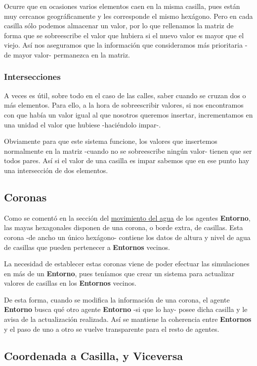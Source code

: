 Ocurre que en ocasiones varios elementos caen en la misma casilla, pues están
muy cercanos geográficamente y les corresponde el mismo hexágono. Pero en cada
casilla sólo podemos almacenar un valor, por lo que rellenamos la matriz de
forma que se sobreescribe el valor que hubiera si el nuevo valor es mayor que el
viejo. Así nos aseguramos que la información que consideramos más prioritaria
-de mayor valor- permanezca en la matriz.

\subsubsection{Intersecciones}

A veces es útil, sobre todo en el caso de las calles, saber cuando se cruzan
dos o más elementos. Para ello, a la hora de sobreescribir valores, si nos
encontramos con que había un valor igual al que nosotros queremos insertar,
incrementamos en una unidad el valor que hubiese -haciéndolo impar-.

Obviamente para que este sistema funcione, los valores que insertemos
normalmente en la matriz -cuando no se sobreescribe ningún valor- tienen que ser
todos pares. Así si el valor de una casilla es impar sabemos que en ese punto
hay una intersección de dos elementos.

\subsection{Coronas}

Como se comentó en la sección del \hyperref[waterMovement]{movimiento del agua}
de los agentes {\bf Entorno}, las mayas hexagonales disponen de una corona, o
borde extra, de casillas. Esta corona -de ancho un único hexágono- contiene los
datos de altura y nivel de agua de casillas que pueden pertenecer a {\bf
Entornos} vecinos.

La necesidad de establecer estas coronas viene de poder efectuar las
simulaciones en más de un {\bf Entorno}, pues teníamos que crear un sistema para
actualizar valores de casillas en los {\bf Entornos} vecinos.

De esta forma, cuando se modifica la información de una corona, el agente {\bf
Entorno} busca qué otro agente {\bf Entorno} -si que lo hay- posee dicha
casilla y le avisa de la actualización realizada. Así se mantiene la coherencia
entre {\bf Entornos} y el paso de uno a otro se vuelve transparente para el
resto de agentes.

\subsection{Coordenada a Casilla, y Viceversa} \label{coordToCasilla}

